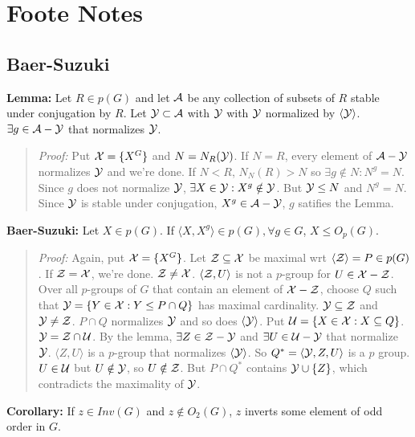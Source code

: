 \chapter{Foote Notes}
\section{Baer-Suzuki}
{\bf Lemma:} Let $R \in p(G)$ and let ${\cal A}$ be any collection of subsets of $R$ stable under conjugation by $R$.
Let ${\cal Y} \subset {\cal A}$ with ${\cal Y}$  with ${\cal Y}$ normalized by  $\langle {\cal Y} \rangle$.
$\exists g \in {\cal A} - {\cal Y}$ that normalizes ${\cal Y}$.
\begin{quote}
\emph{Proof:}  
Put ${\cal X} = \{ X^G \}$ and $N=N_R({\cal Y})$.  If $N=R$, every element of ${\cal A} - {\cal Y}$ normalizes
${\cal Y}$ and we're done.  If $N<R$, $N_N(R)>N$ so $\exists g \notin N: N^g=N$.  Since $g$ does not normalize ${\cal Y}$,
$\exists X \in {\cal Y}: X^g \notin {\cal Y}$.  But ${\cal Y} \leq N$ and $N^g=N$.  Since ${\cal Y}$ is stable
under conjugation, $X^g \in {\cal A} - {\cal Y}$, $g$ satifies the Lemma.
\end{quote}
{\bf Baer-Suzuki:} Let $X \in p(G)$.  If $\langle X, X^g \rangle \in p(G), \forall g \in G$, $X \leq O_p(G)$.
\begin{quote}
\emph{Proof:}  
Again, put ${\cal X} = \{ X^G \}$.  Let ${\cal Z} \subseteq {\cal X}$ be maximal wrt $\langle {\cal Z} \rangle = P \in p(G)$.
If ${\cal Z} = {\cal X}$, we're done. ${\cal Z} \ne {\cal X}$. $\langle {\cal Z}, U \rangle$ is not
a $p$-group for $U \in {\cal X} - {\cal Z}$.  Over all $p$-groups of $G$ that contain an element of 
${\cal X} - {\cal Z}$, choose $Q$ such that ${\cal Y} = \{ Y \in {\cal X} : Y \leq P \cap Q \}$ has maximal cardinality.
${\cal Y} \subseteq {\cal Z}$ and ${\cal Y} \neq {\cal Z}$.  $P \cap Q$ normalizes ${\cal Y}$ and so does
$\langle {\cal Y} \rangle$.  Put ${\cal U} = \{ X \in {\cal X}: X \subseteq Q \}$.  
${\cal Y} = {\cal Z} \cap {\cal U}$.  By the lemma,
$\exists  Z \in {\cal Z} - {\cal Y}$  and 
$\exists  U \in {\cal U} - {\cal Y}$ that normalize ${\cal Y}$.  $\langle Z, U \rangle$ is a $p$-group
that normalizes $\langle {\cal Y} \rangle$.  So $Q^{*}= \langle {\cal Y}, Z, U \rangle$
is a $p$ group. $U \in {\cal U}$ but $U \notin {\cal Y}$, so $U \notin {\cal Z}$.  But
$P \cap Q^{*}$ contains ${\cal Y} \cup \{Z\}$, which contradicts the maximality of ${\cal Y}$.
\end{quote}
{\bf Corollary:} If $z \in Inv(G)$ and $z \notin O_2(G)$, $z$ inverts some element of odd order in $G$.
